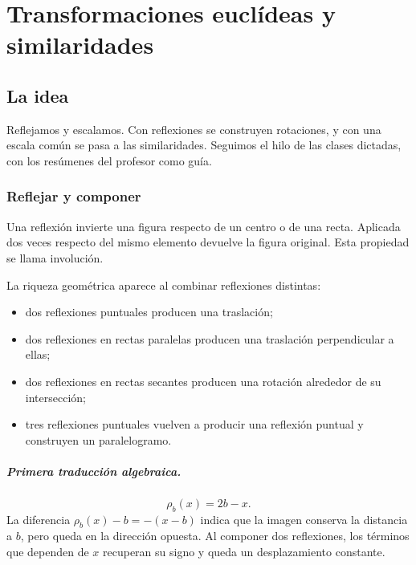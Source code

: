 \chapter{Transformaciones euclídeas y similaridades}\label{cap:05}\label{sec:bloque-euclideas}

\section{La idea}

Reflejamos y escalamos. Con reflexiones se construyen rotaciones, y con una escala común se pasa a las similaridades. Seguimos el hilo de las clases dictadas, con los resúmenes del profesor como guía.

\subsection{Reflejar y componer}\label{sec:reflejar}

{\small\vspace{1mm}\par}


Una reflexión invierte una figura respecto de un centro o de una recta. Aplicada dos veces
respecto del mismo elemento devuelve la figura original. Esta propiedad se llama involución.

La riqueza geométrica aparece al combinar reflexiones distintas:
\begin{itemize}
  \item dos reflexiones puntuales producen una traslación;
  \item dos reflexiones en rectas paralelas producen una traslación perpendicular a ellas;
  \item dos reflexiones en rectas secantes producen una rotación alrededor de su intersección;
  \item tres reflexiones puntuales vuelven a producir una reflexión puntual y construyen un
  paralelogramo.
\end{itemize}

\paragraph{Primera traducción algebraica.}
\[
  \rho_b(x)=2b-x.
\]
La diferencia \(\rho_b(x)-b=-(x-b)\) indica que la imagen conserva la distancia a \(b\),
pero queda en la dirección opuesta. Al componer dos reflexiones, los términos que dependen de
\(x\) recuperan su signo y queda un desplazamiento constante.

